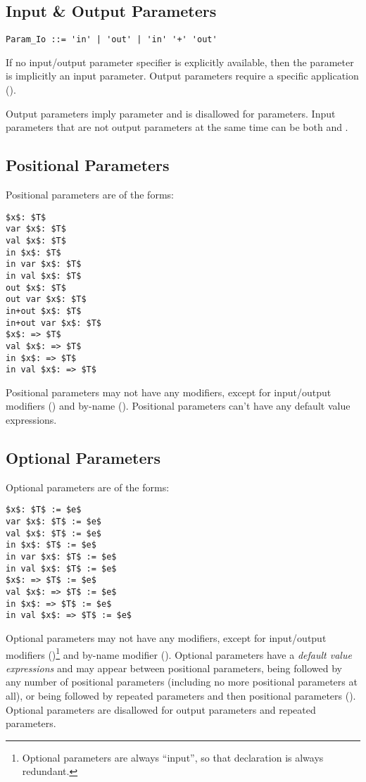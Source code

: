 \subsection{Input \& Output Parameters}
\label{sec:io-parameters}

\syntax\begin{lstlisting}
Param_Io ::= 'in' | 'out' | 'in' '+' 'out'
\end{lstlisting}

If no input/output parameter specifier is explicitly available, then the parameter is implicitly an input parameter. Output parameters require a specific application ().

Output parameters imply  parameter and is disallowed for  parameters. Input parameters that are not output parameters at the same time can be both  and . 

\subsection{Positional Parameters}
\label{sec:positional-parameters}

Positional parameters are of the forms:
\begin{lstlisting}
$x$: $T$
var $x$: $T$
val $x$: $T$
in $x$: $T$
in var $x$: $T$
in val $x$: $T$
out $x$: $T$
out var $x$: $T$
in+out $x$: $T$
in+out var $x$: $T$
$x$: => $T$
val $x$: => $T$
in $x$: => $T$
in val $x$: => $T$
\end{lstlisting}

Positional parameters may not have any modifiers, except for input/output modifiers () and by-name (). Positional parameters can't have any default value expressions. 

\subsection{Optional Parameters}
\label{sec:optional-parameters}

Optional parameters are of the forms:
\begin{lstlisting}
$x$: $T$ := $e$
var $x$: $T$ := $e$
val $x$: $T$ := $e$
in $x$: $T$ := $e$
in var $x$: $T$ := $e$
in val $x$: $T$ := $e$
$x$: => $T$ := $e$
val $x$: => $T$ := $e$
in $x$: => $T$ := $e$
in val $x$: => $T$ := $e$
\end{lstlisting}

Optional parameters may not have any modifiers, except for input/output modifiers ()\footnote{Optional parameters are always ``input'', so that declaration is always redundant.} and by-name modifier (). Optional parameters have a {\em default value expressions} and may appear between positional parameters, being followed by any number of positional parameters (including no more positional parameters at all), or being followed by repeated parameters and then positional parameters (). Optional parameters are disallowed for output parameters and repeated parameters. 

